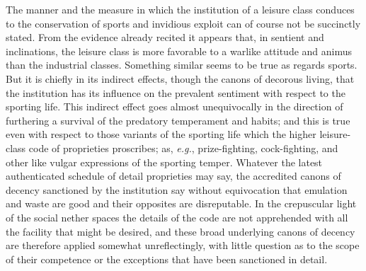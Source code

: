 \documentclass[12pt]{report}
\begin{document}
The manner and the measure in which the institution of a leisure class
conduces to the conservation of sports and invidious exploit can of
course not be succinctly stated. From the evidence already recited it
appears that, in sentient and inclinations, the leisure class is more
favorable to a warlike attitude and animus than the industrial classes.
Something similar seems to be true as regards sports. But it is chiefly
in its indirect effects, though the canons of decorous living, that the
institution has its influence on the prevalent sentiment with respect to
the sporting life. This indirect effect goes almost unequivocally in
the direction of furthering a survival of the predatory temperament
and habits; and this is true even with respect to those variants of
the sporting life which the higher leisure-class code of proprieties
proscribes; as, \emph{e.g.}, prize-fighting, cock-fighting, and other
like vulgar expressions of the sporting temper. Whatever the latest
authenticated schedule of detail proprieties may say, the accredited
canons of decency sanctioned by the institution say without equivocation
that emulation and waste are good and their opposites are disreputable.
In the crepuscular light of the social nether spaces the details of the
code are not apprehended with all the facility that might be desired,
and these broad underlying canons of decency are therefore applied
somewhat unreflectingly, with little question as to the scope of their
competence or the exceptions that have been sanctioned in detail.
\end{document}
